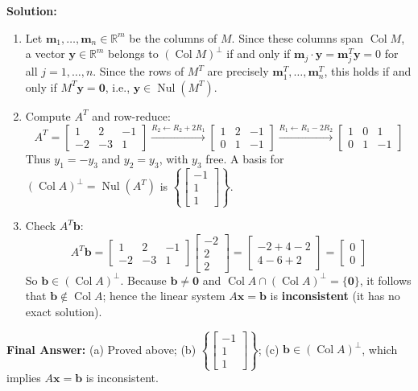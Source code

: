 \documentclass[11pt, letterpaper]{article}
\theoremstyle{definition}
\theoremstyle{remark}
\begin{document}
\textbf{Solution:}
\begin{enumerate}[label=(\alph*)]
    \item Let $\mathbf{m}_1, \dots, \mathbf{m}_n \in \mathbb{R}^m$ be the columns of $M$. Since these columns span $\operatorname{Col} M$, a vector $\mathbf{y} \in \mathbb{R}^m$ belongs to $(\operatorname{Col} M)^{\perp}$ if and only if $\mathbf{m}_j \cdot \mathbf{y} = \mathbf{m}_j^T \mathbf{y} = 0$ for all $j = 1, \dots, n$. Since the rows of $M^T$ are precisely $\mathbf{m}_1^T, \dots, \mathbf{m}_n^T$, this holds if and only if $M^T \mathbf{y} = \mathbf{0}$, i.e., $\mathbf{y} \in \operatorname{Nul}(M^T)$.
    \item Compute $A^T$ and row-reduce:
    \[
    A^T = \begin{bmatrix} 1 & 2 & -1 \\ -2 & -3 & 1 \end{bmatrix}
    \xrightarrow{R_2 \leftarrow R_2 + 2R_1}
    \begin{bmatrix} 1 & 2 & -1 \\ 0 & 1 & -1 \end{bmatrix}
    \xrightarrow{R_1 \leftarrow R_1 - 2R_2}
    \begin{bmatrix} 1 & 0 & 1 \\ 0 & 1 & -1 \end{bmatrix}
    \]
    Thus $y_1 = -y_3$ and $y_2 = y_3$, with $y_3$ free. A basis for $(\operatorname{Col} A)^{\perp} = \operatorname{Nul}(A^T)$ is $\left\{ \begin{bmatrix} -1 \\ 1 \\ 1 \end{bmatrix} \right\}$.
    \item Check $A^T \mathbf{b}$:
    \[
    A^T \mathbf{b} = \begin{bmatrix} 1 & 2 & -1 \\ -2 & -3 & 1 \end{bmatrix} \begin{bmatrix} -2 \\ 2 \\ 2 \end{bmatrix} = \begin{bmatrix} -2 + 4 - 2 \\ 4 - 6 + 2 \end{bmatrix} = \begin{bmatrix} 0 \\ 0 \end{bmatrix}
    \]
    So $\mathbf{b} \in (\operatorname{Col} A)^{\perp}$. Because $\mathbf{b} \neq \mathbf{0}$ and $\operatorname{Col} A \cap (\operatorname{Col} A)^{\perp} = \{\mathbf{0}\}$, it follows that $\mathbf{b} \notin \operatorname{Col} A$; hence the linear system $A\mathbf{x} = \mathbf{b}$ is \textbf{inconsistent} (it has no exact solution).
\end{enumerate}
\textbf{Final Answer:} (a) Proved above; (b) $\left\{ \begin{bmatrix} -1 \\ 1 \\ 1 \end{bmatrix} \right\}$; (c) $\mathbf{b} \in (\operatorname{Col} A)^{\perp}$, which implies $A\mathbf{x} = \mathbf{b}$ is inconsistent.
\end{document}
